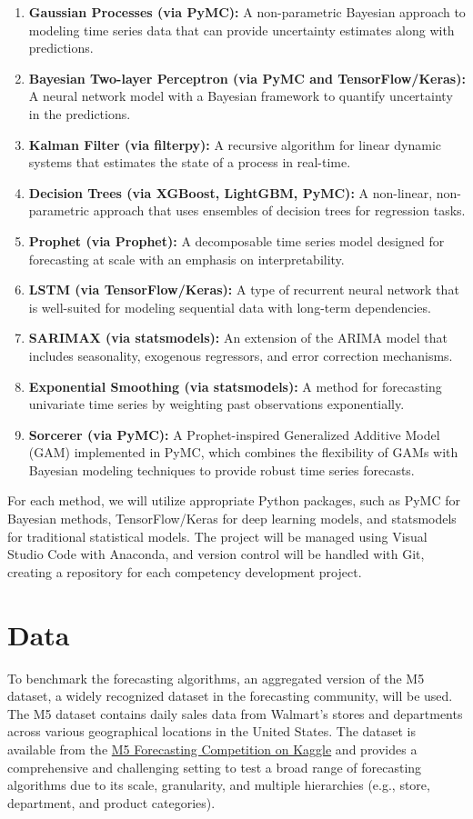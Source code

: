 \begin{enumerate}
	\item \textbf{Gaussian Processes (via PyMC):} A non-parametric Bayesian approach to modeling time series data that can provide uncertainty estimates along with predictions.
	\item \textbf{Bayesian Two-layer Perceptron (via PyMC and TensorFlow/Keras):} A neural network model with a Bayesian framework to quantify uncertainty in the predictions.
	\item \textbf{Kalman Filter (via filterpy):} A recursive algorithm for linear dynamic systems that estimates the state of a process in real-time.
	\item \textbf{Decision Trees (via XGBoost, LightGBM, PyMC):} A non-linear, non-parametric approach that uses ensembles of decision trees for regression tasks.
	\item \textbf{Prophet (via Prophet):} A decomposable time series model designed for forecasting at scale with an emphasis on interpretability.
	\item \textbf{LSTM (via TensorFlow/Keras):} A type of recurrent neural network that is well-suited for modeling sequential data with long-term dependencies.
	\item \textbf{SARIMAX (via statsmodels):} An extension of the ARIMA model that includes seasonality, exogenous regressors, and error correction mechanisms.
	\item \textbf{Exponential Smoothing (via statsmodels):} A method for forecasting univariate time series by weighting past observations exponentially.
	\item \textbf{Sorcerer (via PyMC):} A Prophet-inspired Generalized Additive Model (GAM) implemented in PyMC, which combines the flexibility of GAMs with Bayesian modeling techniques to provide robust time series forecasts.
\end{enumerate}

For each method, we will utilize appropriate Python packages, such as PyMC for Bayesian methods, TensorFlow/Keras for deep learning models, and statsmodels for traditional statistical models. The project will be managed using Visual Studio Code with Anaconda, and version control will be handled with Git, creating a repository for each competency development project.


\section{Data}
To benchmark the forecasting algorithms, an aggregated version of the M5 dataset, a widely recognized dataset in the forecasting community, will be used. The M5 dataset contains daily sales data from Walmart's stores and departments across various geographical locations in the United States. The dataset is available from the \href{https://www.kaggle.com/competitions/m5-forecasting-accuracy/}{M5 Forecasting Competition on Kaggle} and provides a comprehensive and challenging setting to test a broad range of forecasting algorithms due to its scale, granularity, and multiple hierarchies (e.g., store, department, and product categories).

